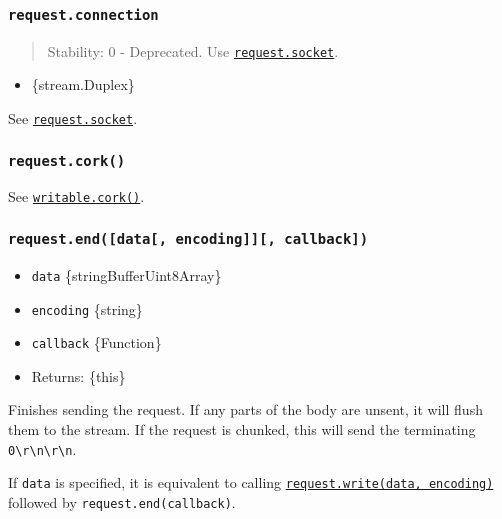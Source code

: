 \subsubsection{\texorpdfstring{\texttt{request.connection}}{request.connection}}\label{request.connection}

\begin{quote}
Stability: 0 - Deprecated. Use
\hyperref[requestsocket]{\texttt{request.socket}}.
\end{quote}

\begin{itemize}
\tightlist
\item
  \{stream.Duplex\}
\end{itemize}

See \hyperref[requestsocket]{\texttt{request.socket}}.

\subsubsection{\texorpdfstring{\texttt{request.cork()}}{request.cork()}}\label{request.cork}

See \href{stream.md\#writablecork}{\texttt{writable.cork()}}.

\subsubsection{\texorpdfstring{\texttt{request.end({[}data{[},\ encoding{]}{]}{[},\ callback{]})}}{request.end({[}data{[}, encoding{]}{]}{[}, callback{]})}}\label{request.enddata-encoding-callback}

\begin{itemize}
\tightlist
\item
  \texttt{data} \{string\textbar Buffer\textbar Uint8Array\}
\item
  \texttt{encoding} \{string\}
\item
  \texttt{callback} \{Function\}
\item
  Returns: \{this\}
\end{itemize}

Finishes sending the request. If any parts of the body are unsent, it
will flush them to the stream. If the request is chunked, this will send
the terminating
\texttt{\textquotesingle{}0\textbackslash{}r\textbackslash{}n\textbackslash{}r\textbackslash{}n\textquotesingle{}}.

If \texttt{data} is specified, it is equivalent to calling
\hyperref[requestwritechunk-encoding-callback]{\texttt{request.write(data,\ encoding)}}
followed by \texttt{request.end(callback)}.

